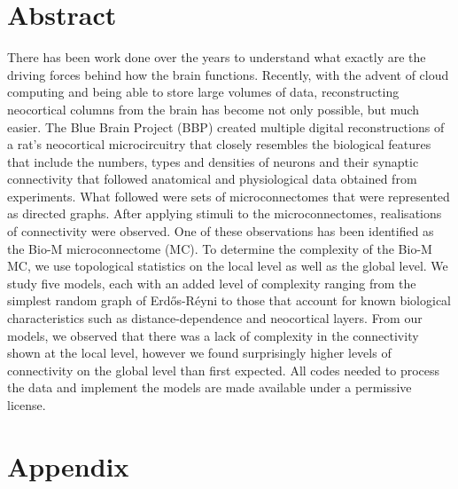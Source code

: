 \documentclass[svgnames]{article}
\newcommand{\ER}{Erd\H{o}s-R\'eyni }
\begin{document}
\section{Abstract}
There has been work done over the years to understand what exactly are the driving forces behind how the brain functions. Recently, with the advent of cloud computing and being able to store large volumes of data, reconstructing neocortical columns from the brain has become not only possible, but much easier. The Blue Brain Project (BBP) created multiple digital reconstructions of a rat's neocortical microcircuitry that closely resembles the biological features that include the numbers, types and densities of neurons and their synaptic connectivity that followed anatomical and physiological data obtained from experiments. What followed were sets of microconnectomes that were represented as directed graphs. After applying stimuli to the microconnectomes, realisations of connectivity were observed. One of these observations has been identified as the Bio-M microconnectome (MC). To determine the complexity of the Bio-M MC, we use topological statistics on the local level as well as the global level. We study five models, each with an added level of complexity ranging from the simplest random graph of \ER to those that account for known biological characteristics such as distance-dependence and neocortical layers. From our models, we observed that there was a lack of complexity in the connectivity shown at the local level, however we found surprisingly higher levels of connectivity on the global level than first expected. All codes needed to process the data and implement the models are made available \cite{Barber_Random_Graph_Models} under a permissive license.

\newpage

\newpage

\newpage

\newpage

\newpage

\newpage

\newpage






\newpage
\section{Appendix}



\end{document}
